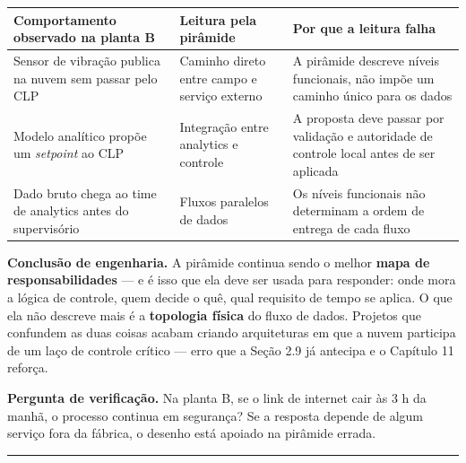 \begin{longtable}[]{@{}
  >{\raggedright\arraybackslash}p{}
  >{\raggedright\arraybackslash}p{}
  >{\raggedright\arraybackslash}p{}@{}}
\toprule\noalign{}
\begin{minipage}[b]{\linewidth}\raggedright
Comportamento observado na planta B
\end{minipage} & \begin{minipage}[b]{\linewidth}\raggedright
Leitura pela pirâmide
\end{minipage} & \begin{minipage}[b]{\linewidth}\raggedright
Por que a leitura falha
\end{minipage} \\
\midrule\noalign{}
\endhead
\bottomrule\noalign{}
\endlastfoot
Sensor de vibração publica na nuvem sem passar pelo CLP & Caminho direto entre campo e serviço externo & A pirâmide descreve níveis funcionais, não impõe um caminho único para os dados \\
Modelo analítico propõe um \emph{setpoint} ao CLP & Integração entre analytics e controle & A proposta deve passar por validação e autoridade de controle local antes de ser aplicada \\
Dado bruto chega ao time de analytics antes do supervisório & Fluxos paralelos de dados & Os níveis funcionais não determinam a ordem de entrega de cada fluxo \\
\end{longtable}

\textbf{Conclusão de engenharia.} A pirâmide continua sendo o melhor \textbf{mapa de responsabilidades} ---
e é isso que ela deve ser usada para responder: onde mora a lógica de controle, quem decide o quê,
qual requisito de tempo se aplica. O que ela não descreve mais é a \textbf{topologia física} do fluxo de
dados. Projetos que confundem as duas coisas acabam criando arquiteturas em que a nuvem participa
de um laço de controle crítico --- erro que a Seção 2.9 já antecipa e o Capítulo 11 reforça.

\textbf{Pergunta de verificação.} Na planta B, se o link de internet cair às 3 h da manhã, o processo
continua em segurança? Se a resposta depende de algum serviço fora da fábrica, o desenho está
apoiado na pirâmide errada.

\begin{center}\rule{0.5\linewidth}{0.5pt}\end{center}

